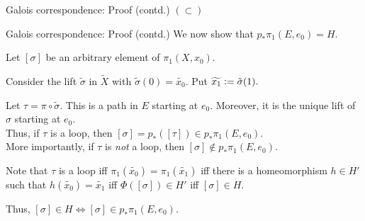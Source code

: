 \documentclass[handout, dvipsnames]{beamer}
\theoremstyle{definition}
\begin{document}
\begin{frame}{Galois correspondence: Proof (contd.)}
    $(\subset)$ 



    \hfill{}
\end{frame}
\begin{frame}{Galois correspondence: Proof (contd.)}
    We now show that $p_*\pi_1(E, e_0) = H.$

    Let $[\sigma]$ be an arbitrary element of $\pi_1(X, x_0).$ 

    Consider the lift $\tilde{\sigma}$ in $\tilde{X}$ with $\tilde{\sigma}(0) = \widetilde{x_0}.$ Put $\widetilde{x_1} \vcentcolon= \tilde{\sigma}(1).$

    Let $\tau = \pi\circ\tilde{\sigma}.$ This is a path in $E$ starting at $e_0.$ Moreover, it is the unique lift of $\sigma$ starting at $e_0.$ \\
    Thus, if $\tau$ is a loop, then $[\sigma] = p_*([\tau]) \in p_*\pi_1(E, e_0).$ \\
    More importantly, if $\tau$ is \emph{not} a loop, then $[\sigma] \notin p_*\pi_1(E, e_0).$

    Note that $\tau$ is a loop iff $\pi_1(\widetilde{x_0}) = \pi_1(\widetilde{x_1})$ iff there is a homeomorphism $h \in H'$ such that $h(\widetilde{x_0}) = \widetilde{x_1}$ iff $\Phi([\sigma]) \in H'$ iff $[\sigma] \in H.$

    Thus, $[\sigma] \in H \iff [\sigma] \in p_*\pi_1(E, e_0).$
\end{frame}
\end{document}
